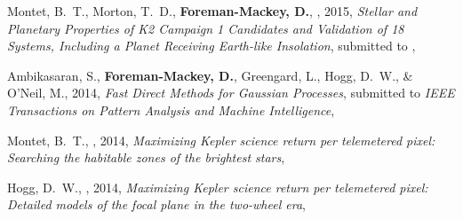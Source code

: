 \item Montet, B.~T., Morton, T.~D., {\bf Foreman-Mackey, D.}, \etal, 2015,
    \emph{Stellar and Planetary Properties of K2 Campaign 1 Candidates and
          Validation of 18 Systems, Including a Planet Receiving Earth-like
          Insolation},
    submitted to \apj, 

\item Ambikasaran, S., {\bf Foreman-Mackey, D.}, Greengard, L., Hogg, D.~W.,
    \& O'Neil, M., 2014,
    \emph{Fast Direct Methods for Gaussian Processes},
    submitted to \emph{IEEE Transactions on Pattern Analysis and Machine
        Intelligence},

\item Montet, B.~T., \etal, 2014,
    \emph{Maximizing Kepler science return per telemetered pixel: Searching
          the habitable zones of the brightest stars},

\item Hogg, D.~W., \etal, 2014,
    \emph{Maximizing Kepler science return per telemetered pixel: Detailed
          models of the focal plane in the two-wheel era},
